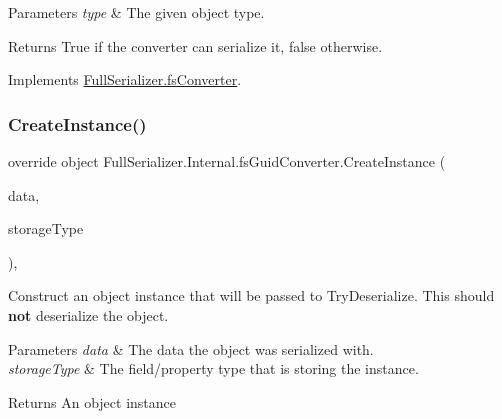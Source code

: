 \begin{DoxyParams}{Parameters}
{\em type} & The given object type.\\
\hline
\end{DoxyParams}
\begin{DoxyReturn}{Returns}
True if the converter can serialize it, false otherwise.
\end{DoxyReturn}


Implements \hyperlink{class_full_serializer_1_1fs_converter_a6d9e084c5e7f646a8d220705efaecb35}{Full\+Serializer.\+fs\+Converter}.

\mbox{\label{class_full_serializer_1_1_internal_1_1fs_guid_converter_a86f7beefe9d841a8f3235a805ec43691}} 
\subsubsection{\texorpdfstring{Create\+Instance()}{CreateInstance()}}
{\footnotesize\ttfamily override object Full\+Serializer.\+Internal.\+fs\+Guid\+Converter.\+Create\+Instance (\begin{DoxyParamCaption}\item[{\hyperlink{class_full_serializer_1_1fs_data}{fs\+Data}}]{data,  }\item[{Type}]{storage\+Type }\end{DoxyParamCaption})\hspace{0.3cm}{\ttfamily [inline]}, {\ttfamily [virtual]}}



Construct an object instance that will be passed to Try\+Deserialize. This should {\bfseries not} deserialize the object. 


\begin{DoxyParams}{Parameters}
{\em data} & The data the object was serialized with.\\
\hline
{\em storage\+Type} & The field/property type that is storing the instance.\\
\hline
\end{DoxyParams}
\begin{DoxyReturn}{Returns}
An object instance
\end{DoxyReturn}


